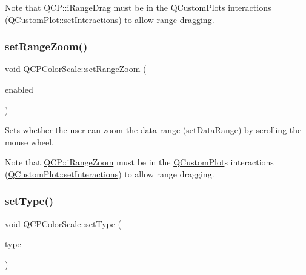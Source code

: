 Note that \hyperlink{namespaceQCP_a2ad6bb6281c7c2d593d4277b44c2b037a2c4432b9aceafb94000be8d1b589ef18}{Q\+C\+P\+::i\+Range\+Drag} must be in the \hyperlink{classQCustomPlot}{Q\+Custom\+Plot}\textquotesingle{}s interactions (\hyperlink{classQCustomPlot_a5ee1e2f6ae27419deca53e75907c27e5}{Q\+Custom\+Plot\+::set\+Interactions}) to allow range dragging. \mbox{\label{classQCPColorScale_a96bd60fb6317ad6821841b539c93eeeb}} 
\subsubsection{\texorpdfstring{set\+Range\+Zoom()}{setRangeZoom()}}
{\footnotesize\ttfamily void Q\+C\+P\+Color\+Scale\+::set\+Range\+Zoom (\begin{DoxyParamCaption}\item[{bool}]{enabled }\end{DoxyParamCaption})}

Sets whether the user can zoom the data range (\hyperlink{classQCPColorScale_abe88633003a26d1e756aa74984587fef}{set\+Data\+Range}) by scrolling the mouse wheel.

Note that \hyperlink{namespaceQCP_a2ad6bb6281c7c2d593d4277b44c2b037abee1e94353525a636aeaf0ba32b72e14}{Q\+C\+P\+::i\+Range\+Zoom} must be in the \hyperlink{classQCustomPlot}{Q\+Custom\+Plot}\textquotesingle{}s interactions (\hyperlink{classQCustomPlot_a5ee1e2f6ae27419deca53e75907c27e5}{Q\+Custom\+Plot\+::set\+Interactions}) to allow range dragging. \mbox{\label{classQCPColorScale_a1bf9bdb291927c422dd66b404b206f1f}} 
\subsubsection{\texorpdfstring{set\+Type()}{setType()}}
{\footnotesize\ttfamily void Q\+C\+P\+Color\+Scale\+::set\+Type (\begin{DoxyParamCaption}\item[{\hyperlink{classQCPAxis_ae2bcc1728b382f10f064612b368bc18a}{Q\+C\+P\+Axis\+::\+Axis\+Type}}]{type }\end{DoxyParamCaption})}

